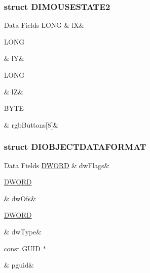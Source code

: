 \subsubsection{struct D\-I\-M\-O\-U\-S\-E\-S\-T\-A\-T\-E2}
\begin{DoxyFields}{Data Fields}
\hypertarget{a00003_a5caab2f62348491c05eb56720be4ed99}{L\-O\-N\-G}\label{a00003_a5caab2f62348491c05eb56720be4ed99}
&
l\-X&
\\
\hline

\hypertarget{a00003_ae174db734839eb185acdb0cd79b9ba24}{L\-O\-N\-G}\label{a00003_ae174db734839eb185acdb0cd79b9ba24}
&
l\-Y&
\\
\hline

\hypertarget{a00003_a7dd7142cab803f67cdcda10d1eb720fd}{L\-O\-N\-G}\label{a00003_a7dd7142cab803f67cdcda10d1eb720fd}
&
l\-Z&
\\
\hline

\hypertarget{a00003_ab6a10dfc57c62fd5c19647c1bbc8eb9f}{B\-Y\-T\-E}\label{a00003_ab6a10dfc57c62fd5c19647c1bbc8eb9f}
&
rgb\-Buttons\mbox{[}8\mbox{]}&
\\
\hline

\end{DoxyFields}
\label{d4/d7d/a00093}
\hypertarget{a00003_d4/d7d/a00093}{}
\subsubsection{struct D\-I\-O\-B\-J\-E\-C\-T\-D\-A\-T\-A\-F\-O\-R\-M\-A\-T}
\begin{DoxyFields}{Data Fields}
\hypertarget{a00003_a4d2f405b1141000eb2af256e0fc8b98b}{\hyperlink{a00003_a50e15ae51c87ae06ab29c8148cb5f36c}{D\-W\-O\-R\-D}}\label{a00003_a4d2f405b1141000eb2af256e0fc8b98b}
&
dw\-Flags&
\\
\hline

\hypertarget{a00003_a2f0da10f0bff2a910138cc1b5715cdd5}{\hyperlink{a00003_a50e15ae51c87ae06ab29c8148cb5f36c}{D\-W\-O\-R\-D}}\label{a00003_a2f0da10f0bff2a910138cc1b5715cdd5}
&
dw\-Ofs&
\\
\hline

\hypertarget{a00003_a81f5eff8d90c90eabc4c9a97d3ea7142}{\hyperlink{a00003_a50e15ae51c87ae06ab29c8148cb5f36c}{D\-W\-O\-R\-D}}\label{a00003_a81f5eff8d90c90eabc4c9a97d3ea7142}
&
dw\-Type&
\\
\hline

\hypertarget{a00003_a149cea59b3110016587a0d7d8b9571ba}{const G\-U\-I\-D $\ast$}\label{a00003_a149cea59b3110016587a0d7d8b9571ba}
&
pguid&
\\
\hline

\end{DoxyFields}
\label{dc/d54/a00094}
\hypertarget{a00003_dc/d54/a00094}{}
